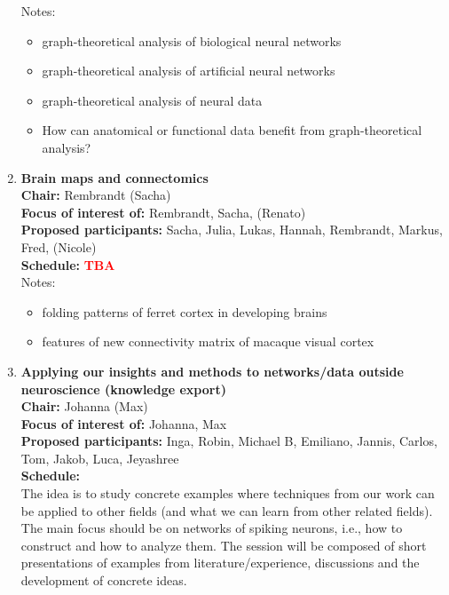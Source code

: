 \documentclass[10pt, a4paper,twoside,american]{article}
\newcommand{\alert}[1]{\textcolor{red}{\bf #1}}
\begin{document}
\begin{enumerate}[resume]
  
  Notes:
  \begin{itemize}
  \item graph-theoretical analysis of biological neural networks 
  \item graph-theoretical analysis of artificial neural networks
  \item graph-theoretical analysis of neural data
  \item How can anatomical or functional data benefit from graph-theoretical analysis?
  \end{itemize}
\item {\large\bf Brain maps and connectomics}\\[1ex]
  {\bf Chair:} Rembrandt (Sacha)\\[1ex]
  {\bf Focus of interest of:} Rembrandt, Sacha, (Renato)\\[1ex]
  {\bf Proposed participants:} Sacha, Julia, Lukas, Hannah, Rembrandt, Markus, Fred, (Nicole)\\[1ex]
  {\bf Schedule:} \alert{TBA}\\[1ex]
  Notes:
  \begin{itemize}
  \item folding patterns of ferret cortex in developing brains
  \item features of new connectivity matrix of macaque visual cortex
  \end{itemize}
\item {\large\bf Applying our insights and methods to networks/data outside neuroscience (knowledge export)}\\[1ex]
  {\bf Chair:} Johanna (Max)\\[1ex]
  {\bf Focus of interest of:} Johanna, Max\\[1ex]
  {\bf Proposed participants:} Inga, Robin, Michael B, Emiliano, Jannis, Carlos, Tom, Jakob, Luca, Jeyashree\\[1ex]
  	{\bf Schedule:}\\[1ex]
	The idea is to study concrete examples where techniques from our
	work can be applied to other fields (and what we can learn from other
	related fields). The main focus should be on networks of spiking
	neurons, i.e., how to construct and how to analyze them.  The
	session will be composed of short presentations of examples 		from literature/experience, discussions and the development of concrete ideas.\\	
  	\begin{itemize}

\end{itemize}
\end{enumerate}
\end{document}
